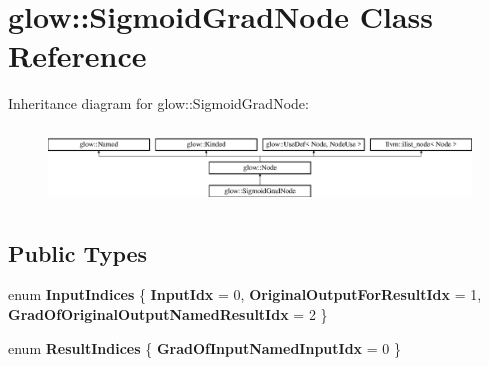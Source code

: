 \hypertarget{classglow_1_1_sigmoid_grad_node}{}\section{glow\+:\+:Sigmoid\+Grad\+Node Class Reference}
\label{classglow_1_1_sigmoid_grad_node}
Inheritance diagram for glow\+:\+:Sigmoid\+Grad\+Node\+:\begin{figure}[H]
\begin{center}
\leavevmode
\includegraphics[height=2.028986cm]{classglow_1_1_sigmoid_grad_node}
\end{center}
\end{figure}
\subsection*{Public Types}
\begin{DoxyCompactItemize}
\item 
\mbox{\label{classglow_1_1_sigmoid_grad_node_a9713663622d733f804e395400d553991}} 
enum {\bfseries Input\+Indices} \{ {\bfseries Input\+Idx} = 0, 
{\bfseries Original\+Output\+For\+Result\+Idx} = 1, 
{\bfseries Grad\+Of\+Original\+Output\+Named\+Result\+Idx} = 2
 \}
\item 
\mbox{\label{classglow_1_1_sigmoid_grad_node_a0f3f5298fb50ca089f22359d0712db1b}} 
enum {\bfseries Result\+Indices} \{ {\bfseries Grad\+Of\+Input\+Named\+Input\+Idx} = 0
 \}
\end{DoxyCompactItemize}
